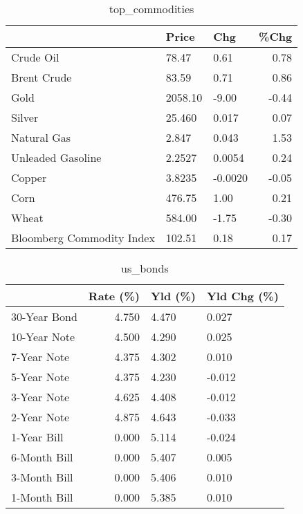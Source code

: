 \documentclass{article}%
\begin{document}
\begin{table}[htbp]%
\caption{top\_commodities}%
\centering%
\begin{adjustbox}{width=1\textwidth}%
\begin{tabular}{lllr}
\toprule
                          &   Price &     Chg &  \%Chg \\
\midrule
               Crude Oil  &   78.47 &    0.61 &  0.78 \\
             Brent Crude  &   83.59 &    0.71 &  0.86 \\
                    Gold  & 2058.10 &   -9.00 & -0.44 \\
                  Silver  &  25.460 &   0.017 &  0.07 \\
             Natural Gas  &   2.847 &   0.043 &  1.53 \\
       Unleaded Gasoline  &  2.2527 &  0.0054 &  0.24 \\
                  Copper  &  3.8235 & -0.0020 & -0.05 \\
                    Corn  &  476.75 &    1.00 &  0.21 \\
                   Wheat  &  584.00 &   -1.75 & -0.30 \\
Bloomberg Commodity Index &  102.51 &    0.18 &  0.17 \\
\bottomrule
\end{tabular}
%
\end{adjustbox}%
\end{table}

%


\begin{table}[htbp]%
\caption{us\_bonds}%
\centering%
\begin{adjustbox}{width=1\textwidth}%
\begin{tabular}{lrll}
\toprule
             &  Rate (\%) & Yld (\%) & Yld Chg (\%) \\
\midrule
30-Year Bond &     4.750 &   4.470 &       0.027 \\
10-Year Note &     4.500 &   4.290 &       0.025 \\
 7-Year Note &     4.375 &   4.302 &       0.010 \\
 5-Year Note &     4.375 &   4.230 &      -0.012 \\
 3-Year Note &     4.625 &   4.408 &      -0.012 \\
 2-Year Note &     4.875 &   4.643 &      -0.033 \\
 1-Year Bill &     0.000 &   5.114 &      -0.024 \\
6-Month Bill &     0.000 &   5.407 &       0.005 \\
3-Month Bill &     0.000 &   5.406 &       0.010 \\
1-Month Bill &     0.000 &   5.385 &       0.010 \\
\bottomrule
\end{tabular}
%
\end{adjustbox}%
\end{table}
\end{document}
